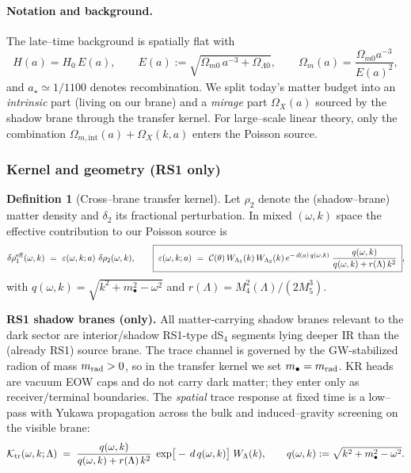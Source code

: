 \documentclass[10pt]{article}
\theoremstyle{definition}
\newtheorem{definition}{Definition}[section]
\theoremstyle{plain}
\begin{document}
\paragraph{Notation and background.}\label{par:uom-main-172}
The late–time background is spatially flat with
\begin{equation}
H(a)=H_0\,E(a),\qquad E(a):=\sqrt{\Omega_{m0}\,a^{-3}+\Omega_{\Lambda 0}},\qquad
\Omega_{m}(a)=\frac{\Omega_{m0} a^{-3}}{E(a)^2},
\end{equation}
and $a_\star\simeq 1/1100$ denotes recombination. We split today’s matter budget into an
\emph{intrinsic} part (living on our brane) and a \emph{mirage} part $\Omega_X(a)$ sourced
by the shadow brane through the transfer kernel. For large–scale linear theory, only the
combination $\Omega_{m,\mathrm{int}}(a)+\Omega_X(k,a)$ enters the Poisson source.

\subsubsection*{Kernel and geometry (RS1 only)}\label{subsubsec:uom-main-016}

\begin{definition}[Cross–brane transfer kernel]\label{def:kernel}
Let $\rho_2$ denote the (shadow–brane) matter density and $\delta_2$ its fractional perturbation.
In mixed $(\omega,k)$ space the effective contribution to our Poisson source is
\begin{equation}\label{eq:kernel-master}
\delta\rho^{\rm eff}_1(\omega,k)\ =\ \varepsilon(\omega,k;a)\ \delta\rho_2(\omega,k),
\qquad
\boxed{\;\varepsilon(\omega,k;a)\ =\ \mathcal C(\theta)\,W_{\Lambda_1}(k)\,W_{\Lambda_2}(k)\,
 e^{-\,d(a)\,q(\omega,k)}\;\frac{q(\omega,k)}{q(\omega,k)+r(\Lambda)\,k^2}\;},
\end{equation}
with $q(\omega,k)=\sqrt{k^2+m_\bullet^2-\omega^2}$ and $r(\Lambda)=M_4^2(\Lambda)/(2M_5^3)$.
\end{definition}

\noindent\textbf{RS1 shadow branes (only).}
All matter-carrying shadow branes relevant to the dark sector are interior/shadow RS1-type dS$_4$
segments lying deeper IR than the (already RS1) source brane. The trace channel is governed by the
GW-stabilized radion of mass $m_{\rm rad}>0$, so in the transfer kernel we set $m_\bullet=m_{\rm rad}$.
KR heads are vacuum EOW caps and do not carry dark matter; they enter only as receiver/terminal boundaries.
The \emph{spatial} trace response at fixed time is a low--pass with Yukawa propagation across the bulk and
induced--gravity screening on the visible brane:
\begin{equation}
{\cal K}_{\rm tr}(\omega,k;\Lambda)\;=\;\frac{q(\omega,k)}{q(\omega,k)+r(\Lambda)\,k^2}\;\exp\!\big[-\,d\,q(\omega,k)\big]\;W_\Lambda(k),
\qquad q(\omega,k):=\sqrt{k^2+m_\bullet^2-\omega^2}.
\end{equation}
\end{document}
